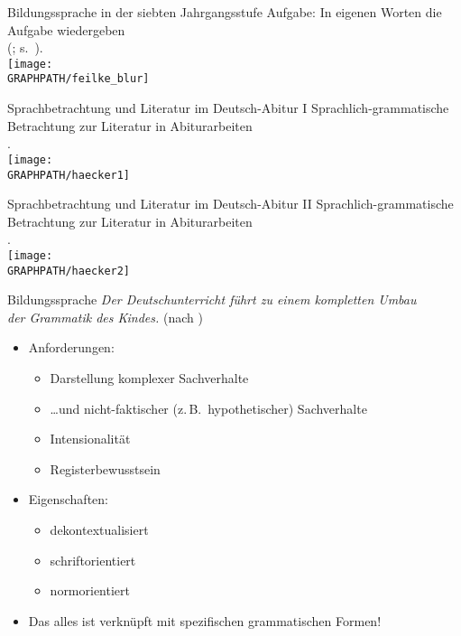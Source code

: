 \begin{frame}
  {Bildungssprache in der siebten Jahrgangsstufe}
  \pause
  Aufgabe: In eigenen Worten die Aufgabe wiedergeben\\
  (\citealt{GogolinLange2011}; s.\ \citealt{Feilke2012}).\\[0.5\baselineskip]
  \pause
  \centering
  \texttt{[image: \\GRAPHPATH/feilke\_blur]}
\end{frame}

\begin{frame}
  {Sprachbetrachtung und Literatur im Deutsch-Abitur I}
  \pause
  Sprachlich-grammatische Betrachtung zur Literatur in Abiturarbeiten\\
  \citep{Haecker2009}.\\[\baselineskip]
  \pause
  \centering
  \texttt{[image: \\GRAPHPATH/haecker1]}
\end{frame}

\begin{frame}
  {Sprachbetrachtung und Literatur im Deutsch-Abitur II}
  Sprachlich-grammatische Betrachtung zur Literatur in Abiturarbeiten\\
  \citep{Haecker2009}.\\[\baselineskip]
  \centering
  \texttt{[image: \\GRAPHPATH/haecker2]}
\end{frame}

\begin{frame}
  {Bildungssprache}
  \pause
  \alert{\textit{Der Deutschunterricht führt zu einem kompletten Umbau\\
  der Grammatik des Kindes.}} (nach \citealt{Bredel2013,Eisenberg2004})\\[\baselineskip]
  \pause
  \begin{itemize}[<+->]
    \item Anforderungen:
    \begin{itemize}[<+->]
      \item Darstellung komplexer Sachverhalte
      \item \dots und nicht-faktischer (z.\,B.\ hypothetischer) Sachverhalte
      \item Intensionalität
      \item Registerbewusstsein
    \end{itemize}
        \vspace{\baselineskip}
      \item Eigenschaften:
    \begin{itemize}[<+->]
      \item dekontextualisiert
      \item schriftorientiert
      \item normorientiert
    \end{itemize}
        \Halbzeile
      \item \alert{Das alles ist verknüpft mit spezifischen grammatischen Formen!}
  \end{itemize}
\end{frame}

